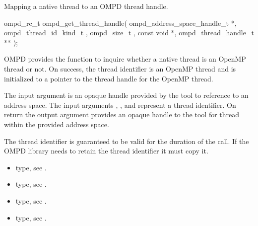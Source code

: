 \label{ompd:ompd_get_thread_handle}
\summary
Mapping a native thread to an OMPD thread handle.
\format
\cspecificstart
\begin{boxedcode}
	ompd\_rc\_t ompd\_get\_thread\_handle(
	ompd\_address\_space\_handle\_t   *, 
	ompd\_thread\_id\_kind\_t           ,
	ompd\_size\_t                    , 
	const void                    *, 
	ompd\_thread\_handle\_t         **
	);
\end{boxedcode}
\cspecificend

\descr
OMPD provides the function 
to inquire whether a native thread is an OpenMP
thread or not.
On success, the thread identifier is an OpenMP thread and 
is initialized to a pointer to the thread handle for the OpenMP thread.

\argdesc


The input argument  is an opaque handle provided by the tool
to reference to an address space.
The input arguments ,  , and  represent a
thread identifier. 
On return the output argument  provides an opaque handle to the
tool for thread within the provided address space.

The thread identifier  is guaranteed to be valid for the duration of the call. If the 
OMPD library needs to retain the thread identifier it must copy it.





\crossreferences
\begin{itemize}
	\item {} type, see .
	\item {} type, see .
	\item {} type, see .
	\item {} type, see .
\end{itemize}

